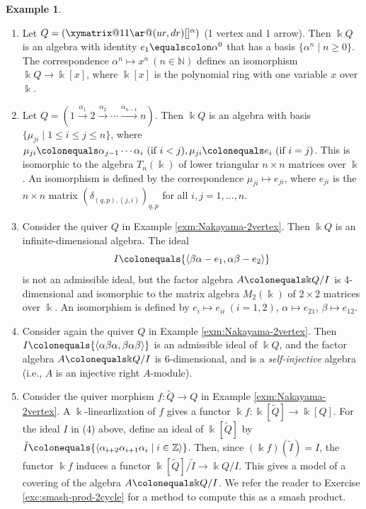 \documentclass{surv-l}
\numberwithin{equation}{chapter}
\numberwithin{figure}{chapter}
\theoremstyle{plain}
\theoremstyle{definition}
\newtheorem{exm}[thm]{Example}
\theoremstyle{remark}
\begin{document}
\begin{exm}\leavevmode
\label{exm:path-algebras}
\begin{enumerate}
\item
Let $Q= (\xymatrix@1{1\ar@(ur,dr)[]^{\alpha}})\ $(1 vertex and 1 arrow).
Then $\Bbbk Q$ is an algebra with identity $e_1\equalscolon\alpha^0$ that has a basis
$\{\alpha^n\mid n \ge 0\}$.
The correspondence $\alpha^n \mapsto x^n\ (n\in \mathbb{N})$ defines
an isomorphism $\Bbbk Q \to \Bbbk[x]$, where $\Bbbk[x]$ is the polynomial ring with
one variable $x$ over $\Bbbk$.
\item
Let $Q=(1\xrightarrow{\alpha_1}2\xrightarrow{\alpha_2}\cdots\xrightarrow{\alpha_{n-1}}n)$.
Then $\Bbbk Q$ is an algebra with basis
$\{\mu_{ji}\mid 1\le i \le j \le n\}$, where
$\mu_{ji}\colonequals \alpha_{j-1}\cdots\alpha_i\ (\text{if } i < j), \mu_{ji}\colonequals e_i\ (\text{if } i=j)$.
This is isomorphic to the algebra $T_n(\Bbbk)$ of lower triangular $n \times n$ matrices
over $\Bbbk$.  An isomorphism is defined by the correspondence
$\mu_{ji} \mapsto e_{ji}$, where
$ e_{ji}$ is the $n \times n$ matrix $(\delta_{(q,p), (j,i)})_{q,p}$ for all $i,j = 1,\dots,n$.

\item
Consider the quiver $Q$ in Example \ref{exm:Nakayama-2vertex}.
Then $\Bbbk Q$ is an infinite-dimen\-sional algebra.
The ideal
\[
I\colonequals  {\langle\beta\alpha - e_1, \alpha\beta - e_2 \rangle}
\]
is not an admissible ideal, but the factor algebra
$A\colonequals \Bbbk Q/I$ is 4-dimen\-sional and isomorphic to
the matrix algebra $M_2(\Bbbk)$ of $2 \times 2$ matrices over $\Bbbk$.
An isomorphism is defined by
$e_i\mapsto e_{ii}\ (i=1,2)$, $\alpha \mapsto e_{21}$,
$\beta \mapsto e_{12}$.
\item
Consider again the quiver $Q$ in Example \ref{exm:Nakayama-2vertex}.
Then $I\colonequals  {\langle\alpha\beta\alpha, \beta\alpha\beta \rangle}$ is an admissible ideal of $\Bbbk Q$,
and the factor algebra $A\colonequals \Bbbk Q/I$ is 6-dimensional, and
is a \emph{self-injective} algebra (i.e., $A$ is an injective right $A$-module).
\item
Consider the quiver morphism $f\colon \tilde{Q} \to Q$
in Example \ref{exm:Nakayama-2vertex}.
A $\Bbbk$-linearliza\-tion of $f$ gives a functor
$\Bbbk f \colon \Bbbk[\tilde{Q}] \to \Bbbk[Q]$.
For the ideal $I$ in (4) above, define an ideal of $\Bbbk[\tilde{Q}]$ by
$\tilde{I}\colonequals {\langle\alpha_{i+2}\alpha_{i+1}\alpha_{i} \mid i \in \mathbb{Z} \rangle}$.
Then, since $(\Bbbk f)(\tilde{I}) = I$, the functor $\Bbbk f$ induces a functor
$\Bbbk[\tilde{Q}]/\tilde{I} \to \Bbbk Q/I$.
This gives a model of a covering of the algebra
$A\colonequals  \Bbbk Q/I$.
We refer the reader to Exercise \ref{exc:smash-prod-2cycle} for
a method to compute this as a smash product.
\end{enumerate}
\end{exm}
\end{document}
